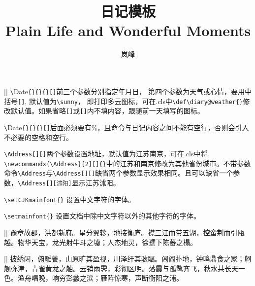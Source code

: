 \documentclass{diary}
\title{日记模板 \\{\small Plain Life and Wonderful Moments}}
\author{岚峰}
\begin{document}
\maketitle

\Address[中国][北京]
[\sun]%
\verb|\|Date\verb|{}{}{}[]|前三个参数分别指定年月日， 第四个参数为天气或心情，要用中括号\verb|[]|, 默认值为\verb|\sunny|， 即打印多云图标，可在.cls中\verb|\def\diary@weather{}|修改默认值。如果省略\verb|[]|或\verb|[]|内不填内容，跟随前一天填写的图标。

\verb|\|Date\verb|{}{}{}[]|后面必须要有\%，且命令与日记内容之间不能有空行，否则会引入不必要的空格和空行。

\verb|\Address[][]|两个参数设置地址，默认值为江苏南京，可在.cls中将
\verb|\newcommandx{\Address}[2][]{}|中的江苏和南京修改为其他省份城市。不带参数命令\verb|\Address|与\verb|\Address[][]|缺省两个参数显示效果相同。且可以缺省一个参数，\verb|\Address[][沭阳]|显示江苏沭阳。

\verb|\setCJKmainfont{}| 设置中文字符的字体。

\verb|\setmainfont{}| 设置文档中除中文字符以外的其他字符的字体。

\Address[][沭阳]
[]%
豫章故郡，洪都新府。星分翼轸，地接衡庐。襟三江而带五湖，控蛮荆而引瓯越。物华天宝，龙光射牛斗之墟；人杰地灵，徐孺下陈蕃之榻。

\Address[][]
[\winkSmile]%
披绣闼，俯雕甍，山原旷其盈视，川泽纡其骇瞩。闾阎扑地，钟鸣鼎食之家；舸舰弥津，青雀黄龙之舳。云销雨霁，彩彻区明。落霞与孤鹜齐飞，秋水共长天一色。渔舟唱晚，响穷彭蠡之滨；雁阵惊寒，声断衡阳之浦。
\end{document}
